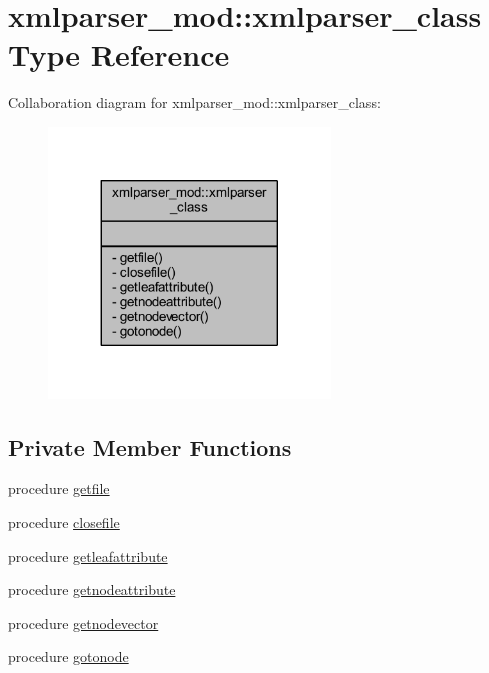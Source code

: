 \hypertarget{structxmlparser__mod_1_1xmlparser__class}{}\section{xmlparser\+\_\+mod\+:\+:xmlparser\+\_\+class Type Reference}
\label{structxmlparser__mod_1_1xmlparser__class}


Collaboration diagram for xmlparser\+\_\+mod\+:\+:xmlparser\+\_\+class\+:\nopagebreak
\begin{figure}[H]
\begin{center}
\leavevmode
\includegraphics[width=212pt]{structxmlparser__mod_1_1xmlparser__class__coll__graph}
\end{center}
\end{figure}
\subsection*{Private Member Functions}
\begin{DoxyCompactItemize}
\item 
procedure \mbox{\hyperlink{structxmlparser__mod_1_1xmlparser__class_a8e0ad8c206828eeefb790224078a66a0}{getfile}}
\item 
procedure \mbox{\hyperlink{structxmlparser__mod_1_1xmlparser__class_a4591b4aad89a5dc75d3e2c0a338b916a}{closefile}}
\item 
procedure \mbox{\hyperlink{structxmlparser__mod_1_1xmlparser__class_a2fef6b1f3d8c3daf38f6d82b87abc4e5}{getleafattribute}}
\item 
procedure \mbox{\hyperlink{structxmlparser__mod_1_1xmlparser__class_a75892404ed305fb3587e02733c8cb19c}{getnodeattribute}}
\item 
procedure \mbox{\hyperlink{structxmlparser__mod_1_1xmlparser__class_ae64ee0cd25265d052136c131bc62edd9}{getnodevector}}
\item 
procedure \mbox{\hyperlink{structxmlparser__mod_1_1xmlparser__class_ab8393d12a17d3409c136cdf29d0463b2}{gotonode}}
\end{DoxyCompactItemize}


